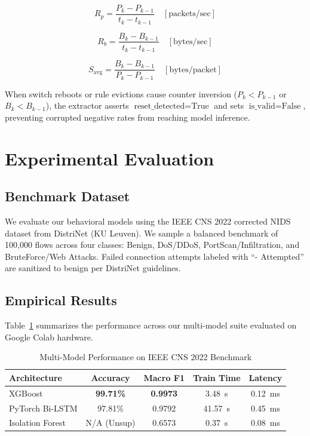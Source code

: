 \documentclass[conference]{IEEEtran}
\begin{document}
\begin{equation}
R_p = \frac{P_k - P_{k-1}}{t_k - t_{k-1}} \quad [\text{packets/sec}]
\end{equation}

\begin{equation}
R_b = \frac{B_k - B_{k-1}}{t_k - t_{k-1}} \quad [\text{bytes/sec}]
\end{equation}

\begin{equation}
S_{\text{avg}} = \frac{B_k - B_{k-1}}{P_k - P_{k-1}} \quad [\text{bytes/packet}]
\end{equation}

When switch reboots or rule evictions cause counter inversion ($P_k < P_{k-1}$ or $B_k < B_{k-1}$), the extractor asserts $\text{reset\_detected} = \text{True}$ and sets $\text{is\_valid} = \text{False}$, preventing corrupted negative rates from reaching model inference.

\section{Experimental Evaluation}

\subsection{Benchmark Dataset}
We evaluate our behavioral models using the IEEE CNS 2022 corrected NIDS dataset from DistriNet (KU Leuven). We sample a balanced benchmark of 100,000 flows across four classes: Benign, DoS/DDoS, PortScan/Infiltration, and BruteForce/Web Attacks. Failed connection attempts labeled with ``- Attempted'' are sanitized to benign per DistriNet guidelines.

\subsection{Empirical Results}
Table~\ref{tab:results} summarizes the performance across our multi-model suite evaluated on Google Colab hardware.

\begin{table}[htbp]
\caption{Multi-Model Performance on IEEE CNS 2022 Benchmark}
\label{tab:results}
\centering
\begin{tabular}{lcccc}
\toprule
\textbf{Architecture} & \textbf{Accuracy} & \textbf{Macro F1} & \textbf{Train Time} & \textbf{Latency} \\
\midrule
XGBoost & \textbf{99.71\%} & \textbf{0.9973} & 3.48~s & 0.12~ms \\
PyTorch Bi-LSTM & 97.81\% & 0.9792 & 41.57~s & 0.45~ms \\
Isolation Forest & N/A (Unsup) & 0.6573 & 0.37~s & 0.08~ms \\
\bottomrule
\end{tabular}
\end{table}
\end{document}
